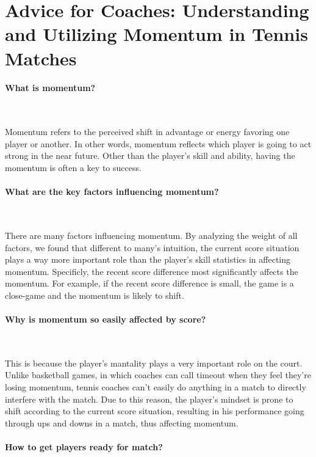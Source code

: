 \section{Advice for Coaches: Understanding and Utilizing Momentum in Tennis Matches}

\paragraph{What is momentum?}~{}

Momentum refers to the perceived shift in advantage or energy favoring one player or another. In other words, momentum reflects which player is going to act strong in the near future. Other than the player's skill and ability, having the momentum is often a key to success.

\paragraph{What are the key factors influencing momentum?}~{}

There are many factors influencing momentum. By analyzing the weight of all factors, we found that different to many's intuition, the current score situation plays a way more important role than the player's skill statistics in affecting momentum. Specificly, the recent score difference most significantly affects the momentum. For example, if the recent score difference is small, the game is a close-game and the momentum is likely to shift.

\paragraph{Why is momentum so easily affected by score?}~{}

This is because the player's mantality plays a very important role on the court. Unlike basketball games, in which coaches can call timeout when they feel they're losing momentum, tennis coaches can't easily do anything in a match to directly interfere with the match. Due to this reason, the player's mindset is prone to shift according to the current score situation, resulting in his performance going through ups and downs in a match, thus affecting momentum.

\paragraph{How to get players ready for match?}~{}

